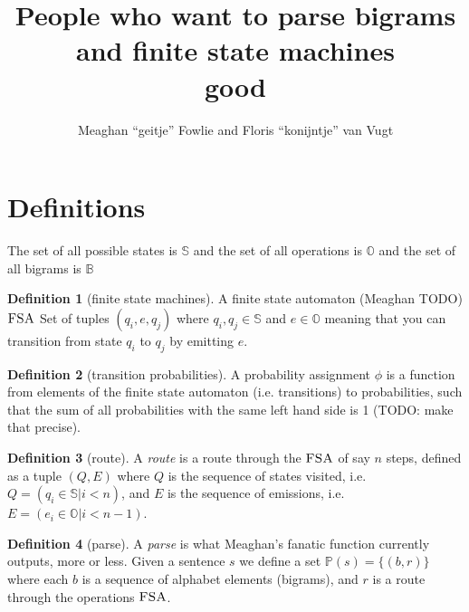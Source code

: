 \documentclass[12pt]{article}
\title{People who want to parse bigrams and finite state machines\\good}
\author{Meaghan ``geitje'' Fowlie and Floris ``konijntje'' van Vugt}
\theoremstyle{definition}
\newtheorem{definition}{Definition}[section]
\begin{document}
\maketitle

\section{Definitions}

\newcommand\STATES{\mathbb{S}}
\newcommand\OPS{\mathbb{O}}
\newcommand\BIGR{\mathbb{B}}
\newcommand\FSA{\textsc{FSA}}
\newcommand\PARSES{\mathbb{P}}
\newcommand\SC{\textsc{SC}}
\newcommand\TC{\textsc{TC}}
\newcommand\N{\mathbb{N}}

The set of all possible states is $\STATES$ and the set of all operations is $\OPS$ and the set of all bigrams is $\BIGR$



\begin{definition}[finite state machines]
  A finite state automaton (Meaghan TODO) $\FSA$
  Set of tuples $(q_i,e,q_j)$ where $q_i,q_j\in\STATES$ and $e\in\OPS$ meaning that you can transition from state $q_i$ to $q_j$ by emitting $e$.
\end{definition}

\begin{definition}[transition probabilities]
  A probability assignment $\phi$ is a function from elements of the finite state automaton (i.e. transitions) to probabilities, such that the sum of all probabilities with the same left hand side is 1 (TODO: make that precise).
\end{definition}


\begin{definition}[route]
  A \emph{route} is a route through the $\FSA$ of say $n$ steps, defined as a tuple $(Q,E)$ where $Q$ is the sequence of states visited, i.e.
  $Q=(q_i\in\STATES|i<n)$, and $E$ is the sequence of emissions, i.e. $E=(e_i\in\OPS|i<n-1)$.
\end{definition}


\begin{definition}[parse]
  A \emph{parse} is what Meaghan's fanatic function currently outputs, more or less.
  Given a sentence $s$ we define a set $\PARSES(s) = \{ (b,r) \}$ where each $b$ is a sequence of alphabet elements (bigrams), and $r$ is a route through the operations $\FSA$.
\end{definition}
\end{document}
